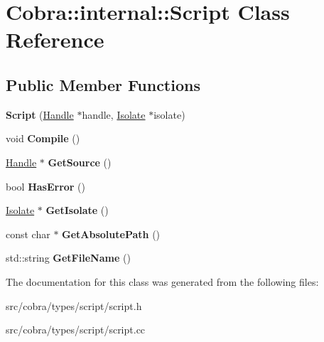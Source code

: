 \hypertarget{class_cobra_1_1internal_1_1_script}{\section{Cobra\+:\+:internal\+:\+:Script Class Reference}
\label{class_cobra_1_1internal_1_1_script}
}
\subsection*{Public Member Functions}
\begin{DoxyCompactItemize}
\item 
\hypertarget{class_cobra_1_1internal_1_1_script_ab0dfb9a0a4882dd1300a4095fff753b6}{{\bfseries Script} (\hyperlink{class_cobra_1_1internal_1_1_handle}{Handle} $\ast$handle, \hyperlink{class_cobra_1_1internal_1_1_isolate}{Isolate} $\ast$isolate)}\label{class_cobra_1_1internal_1_1_script_ab0dfb9a0a4882dd1300a4095fff753b6}

\item 
\hypertarget{class_cobra_1_1internal_1_1_script_a4bf8df38004b8c9e499b42d2f1141754}{void {\bfseries Compile} ()}\label{class_cobra_1_1internal_1_1_script_a4bf8df38004b8c9e499b42d2f1141754}

\item 
\hypertarget{class_cobra_1_1internal_1_1_script_af7e4c059682b56d466083f5ee2b0435d}{\hyperlink{class_cobra_1_1internal_1_1_handle}{Handle} $\ast$ {\bfseries Get\+Source} ()}\label{class_cobra_1_1internal_1_1_script_af7e4c059682b56d466083f5ee2b0435d}

\item 
\hypertarget{class_cobra_1_1internal_1_1_script_a6280b18bbd397e78a6434fa32d82f004}{bool {\bfseries Has\+Error} ()}\label{class_cobra_1_1internal_1_1_script_a6280b18bbd397e78a6434fa32d82f004}

\item 
\hypertarget{class_cobra_1_1internal_1_1_script_ab9b6b9a9a8ef1dd7fdd697281d3b6e52}{\hyperlink{class_cobra_1_1internal_1_1_isolate}{Isolate} $\ast$ {\bfseries Get\+Isolate} ()}\label{class_cobra_1_1internal_1_1_script_ab9b6b9a9a8ef1dd7fdd697281d3b6e52}

\item 
\hypertarget{class_cobra_1_1internal_1_1_script_aa5518a367d696148e28218e204bc27fb}{const char $\ast$ {\bfseries Get\+Absolute\+Path} ()}\label{class_cobra_1_1internal_1_1_script_aa5518a367d696148e28218e204bc27fb}

\item 
\hypertarget{class_cobra_1_1internal_1_1_script_a7597bd8421590bcbe0d6e585630df934}{std\+::string {\bfseries Get\+File\+Name} ()}\label{class_cobra_1_1internal_1_1_script_a7597bd8421590bcbe0d6e585630df934}

\end{DoxyCompactItemize}


The documentation for this class was generated from the following files\+:\begin{DoxyCompactItemize}
\item 
src/cobra/types/script/script.\+h\item 
src/cobra/types/script/script.\+cc\end{DoxyCompactItemize}
